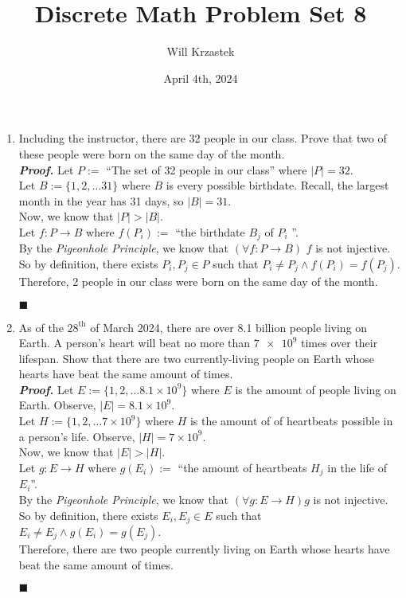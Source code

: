 \documentclass[11pt,a4paper]{article}
\begin{document}
 
\title{Discrete Math Problem Set 8}
\author{Will Krzastek}
\date{April 4th, 2024}
\maketitle

\begin{enumerate}
    \item 
    Including the instructor, there are 32 people in our class. Prove that two of these people were born on the same day of the month. \\
    \emph{\textbf{Proof.}} Let $P := $ ``The set of 32 people in our class'' where $|P| = 32 $. \\
    Let $B :=  \{1, 2, \dots 31 \}$ where $B$ is every possible birthdate. Recall, the largest month in the year has 31 days, so $|B| = 31 $. \\
    Now, we know that $|P| > |B| $. \\ 
    Let $f: P \rightarrow B $ where $f(P_i) :=  $ ``the birthdate $B_j $ of $P_i $  ''. \\ 
    By the \emph{Pigeonhole Principle}, we know that $(\forall f: P \rightarrow B)$ $f$ is not injective. 
    So by definition, there exists $P_i, P_j \in P$ such that $P_i \neq P_j \land f(P_i) = f(P_j) $. \\
    Therefore, 2 people in our class were born on the same day of the month.
    \begin{flushright}
        $\blacksquare$
    \end{flushright}

    \item 
    As of the $28^{\text{th}} $ of March 2024, there are over 8.1 billion people living on Earth. 
    A person's heart will beat no more than  $\num{7e9} $ times over their lifespan. Show that there are two currently-living people on Earth whose hearts have beat the same amount of times. \\
    \emph{\textbf{Proof.}} Let $E := \{1, 2, \dots 8.1 \times 10^9 \} $ where $E $ is the amount of people living on Earth. Observe, $|E| = 8.1 \times 10^9 $. \\
    Let $H := \{1, 2, \dots 7 \times 10^9 \} $ where $H$ is the amount of of heartbeats possible in a person's life. Observe, $|H| = 7 \times 10^9 $. \\
    Now, we know that $|E| > |H| $. \\
    Let $g: E \rightarrow H $ where $g(E_i) :=  $ ``the amount of heartbeats $H_j$ in the life of $E_i$''. \\
    By the \emph{Pigeonhole Principle}, we know that $(\forall g: E \rightarrow H) g $ is not injective. 
    So by definition, there exists $E_i, E_j \in E $ such that $E_i \neq E_j \land g(E_i) = g(E_j) $. \\
    Therefore, there are two people currently living on Earth whose hearts have beat the same amount of times. 
    \begin{flushright}
        $\blacksquare$
    \end{flushright}


\end{enumerate}
\end{document}
